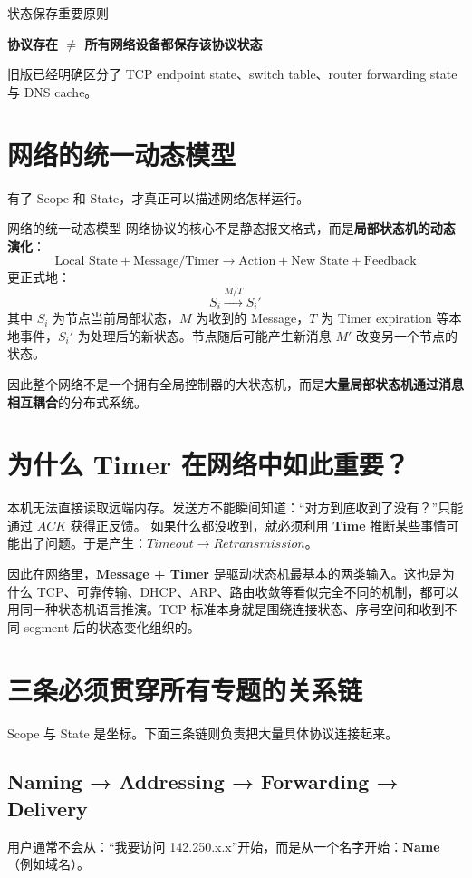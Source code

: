 \documentclass[11pt,a4paper,openany]{ctexbook}
\newcommand{\key}[1]{\textbf{\color{deep}#1}}
\begin{document}
\begin{methodbox}{状态保存重要原则}
\begin{center}
\textbf{协议存在 $\neq$ 所有网络设备都保存该协议状态}
\end{center}
\end{methodbox}
旧版已经明确区分了 TCP endpoint state、switch table、router forwarding state 与 DNS cache。

\section{网络的统一动态模型}
有了 Scope 和 State，才真正可以描述网络怎样运行。

\begin{corebox}{网络的统一动态模型}
网络协议的核心不是静态报文格式，而是\textbf{局部状态机的动态演化}：
\[
\text{Local State} + \text{Message/Timer} \rightarrow \text{Action} + \text{New State} + \text{Feedback}
\]
更正式地：
\[
S_i \xrightarrow{M/T} S_i'
\]
其中 $S_i$ 为节点当前局部状态，$M$ 为收到的 Message，$T$ 为 Timer expiration 等本地事件，$S_i'$ 为处理后的新状态。节点随后可能产生新消息 $M'$ 改变另一个节点的状态。

因此整个网络不是一个拥有全局控制器的大状态机，而是\textbf{大量局部状态机通过消息相互耦合}的分布式系统。
\end{corebox}

\section{为什么 Timer 在网络中如此重要？}
本机无法直接读取远端内存。发送方不能瞬间知道：“对方到底收到了没有？”只能通过 $ACK$ 获得正反馈。
如果什么都没收到，就必须利用 \key{Time} 推断某些事情可能出了问题。于是产生：$Timeout \rightarrow Retransmission$。

因此在网络里，\key{Message + Timer}
是驱动状态机最基本的两类输入。这也是为什么 TCP、可靠传输、DHCP、ARP、路由收敛等看似完全不同的机制，都可以用同一种状态机语言推演。TCP 标准本身就是围绕连接状态、序号空间和收到不同 segment 后的状态变化组织的。

\section{三条必须贯穿所有专题的关系链}
Scope 与 State 是坐标。下面三条链则负责把大量具体协议连接起来。

\subsection{Naming → Addressing → Forwarding → Delivery}
用户通常不会从：“我要访问 142.250.x.x”开始，而是从一个名字开始：\key{Name}（例如域名）。
\end{document}
